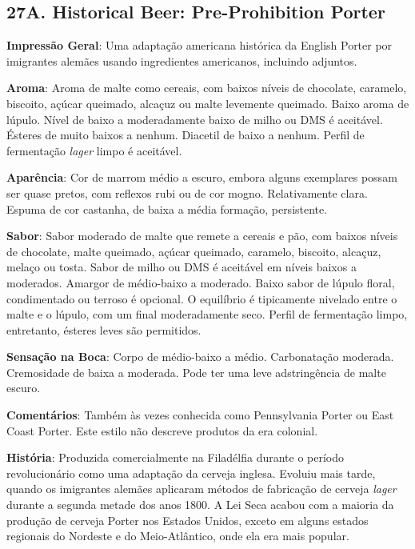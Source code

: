 \subsection*{27A. Historical Beer: Pre-Prohibition Porter}
\textbf{Impressão Geral}: Uma adaptação americana histórica da English Porter por imigrantes alemães usando ingredientes americanos, incluindo adjuntos.

\textbf{Aroma}: Aroma de malte como cereais, com baixos níveis de chocolate, caramelo, biscoito, açúcar queimado, alcaçuz ou malte levemente queimado. Baixo aroma de lúpulo. Nível de baixo a moderadamente baixo de milho ou DMS é aceitável. Ésteres de muito baixos a nenhum. Diacetil de baixo a nenhum. Perfil de fermentação \textit{lager} limpo é aceitável.

\textbf{Aparência}: Cor de marrom médio a escuro, embora alguns exemplares possam ser quase pretos, com reflexos rubi ou de cor mogno. Relativamente clara. Espuma de cor castanha, de baixa a média formação, persistente.

\textbf{Sabor}: Sabor moderado de malte que remete a cereais e pão, com baixos níveis de chocolate, malte queimado, açúcar queimado, caramelo, biscoito, alcaçuz, melaço ou tosta. Sabor de milho ou DMS é aceitável em níveis baixos a moderados. Amargor de médio-baixo a moderado. Baixo sabor de lúpulo floral, condimentado ou terroso é opcional. O equilíbrio é tipicamente nivelado entre o malte e o lúpulo, com um final moderadamente seco. Perfil de fermentação limpo, entretanto, ésteres leves são permitidos.

\textbf{Sensação na Boca}: Corpo de médio-baixo a médio. Carbonatação moderada. Cremosidade de baixa a moderada. Pode ter uma leve adstringência de malte escuro.

\textbf{Comentários}: Também às vezes conhecida como Pennsylvania Porter ou East Coast Porter. Este estilo não descreve produtos da era colonial.

\textbf{História}: Produzida comercialmente na Filadélfia durante o período revolucionário como uma adaptação da cerveja inglesa. Evoluiu mais tarde, quando os imigrantes alemães aplicaram métodos de fabricação de cerveja \textit{lager} durante a segunda metade dos anos 1800. A Lei Seca acabou com a maioria da produção de cerveja Porter nos Estados Unidos, exceto em alguns estados regionais do Nordeste e do Meio-Atlântico, onde ela era mais popular.

